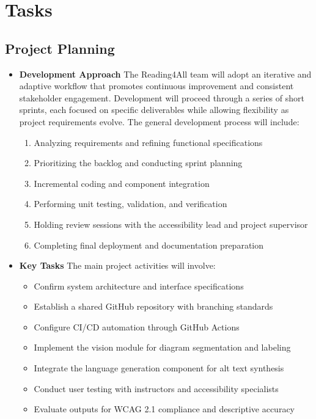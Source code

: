 \documentclass[12pt]{article}
\begin{document}
\section{Tasks}

\subsection{Project Planning}

\begin{itemize}
    \item \textbf{Development Approach}  
    The Reading4All team will adopt an iterative and adaptive workflow that promotes continuous improvement and consistent stakeholder engagement. Development will proceed through a series of short sprints, each focused on specific deliverables while allowing flexibility as project requirements evolve.  
    The general development process will include:
    \begin{enumerate}
        \item Analyzing requirements and refining functional specifications  
        \item Prioritizing the backlog and conducting sprint planning  
        \item Incremental coding and component integration  
        \item Performing unit testing, validation, and verification  
        \item Holding review sessions with the accessibility lead and project supervisor  
        \item Completing final deployment and documentation preparation  
    \end{enumerate}

    \item \textbf{Key Tasks}  
    The main project activities will involve:
    \begin{itemize}
      \item Confirm system architecture and interface specifications
      \item Establish a shared GitHub repository with branching standards
      \item Configure CI/CD automation through GitHub Actions
      \item Implement the vision module for diagram segmentation and labeling
      \item Integrate the language generation component for alt text synthesis
      \item Conduct user testing with instructors and accessibility specialists
      \item Evaluate outputs for WCAG 2.1 compliance and descriptive accuracy
    \end{itemize}


\end{itemize}
\end{document}
